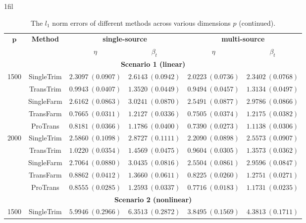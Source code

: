 \documentclass[12pt]{article}
\makeatletter
\newcommand*{\centerfloat}{%
  \parindent \z@
  \leftskip \z@ \@plus 1fil \@minus \marginparwidth
  \rightskip \leftskip
  \parfillskip \z@skip}
\makeatother
\begin{document}
\begin{table}[!ht]
\renewcommand{\arraystretch}{0.6}
\footnotesize
\centerfloat
\caption{The $l_1$ norm errors of different methods across various dimensions $p$ (continued).}
\label{table:l1_norm_p_sd_continued}
\begin{tabular}{cccccc}
        \toprule
        \multirow{2}{*}{$\bm{p}$} & \multirow{2}{*}{\textbf{Method}} & \multicolumn{2}{c}{\textbf{single-source}} & \multicolumn{2}{c}{\textbf{multi-source}}\\
        \cmidrule(lr){3-4} \cmidrule(lr){5-6} 
        & & $\eta$ & $\beta_{t}$ & $\eta$& $\beta_{t}$ \\
        \midrule
        \multicolumn{6}{c}{\textbf{Scenario 1 (linear)}}\\
        \hline
       \multirow{5}{*}{1500}
& SingleTrim  & $2.3097\ (0.0907)$ & $2.6143\ (0.0942)$ & $2.0223\ (0.0736)$ & $2.3402\ (0.0768)$ \\
& TransTrim   & $0.9943\ (0.0407)$ & $1.3520\ (0.0449)$ & $0.9494\ (0.0457)$ & $1.3134\ (0.0497)$ \\
& SingleFarm  & $2.6162\ (0.0863)$ & $3.0241\ (0.0870)$ & $2.5491\ (0.0877)$ & $2.9786\ (0.0866)$ \\
& TransFarm   & $0.7665\ (0.0311)$ & $1.2127\ (0.0336)$ & $0.7505\ (0.0374)$ & $1.2175\ (0.0382)$ \\
& ProTrans    & $\bm{0.8181}\ (0.0366)$ & $\bm{1.1786}\ (0.0400)$ & $\bm{0.7390}\ (0.0273)$ & $\bm{1.1138}\ (0.0306)$ \\
\hline
\multirow{5}{*}{2000}
& SingleTrim  & $2.5860\ (0.1098)$ & $2.8727\ (0.1111)$ & $2.2090\ (0.0898)$ & $2.5573\ (0.0907)$ \\
& TransTrim   & $1.0220\ (0.0354)$ & $1.4569\ (0.0475)$ & $0.9604\ (0.0305)$ & $1.3573\ (0.0362)$ \\
& SingleFarm  & $2.7064\ (0.0880)$ & $3.0435\ (0.0816)$ & $2.5504\ (0.0861)$ & $2.9596\ (0.0847)$ \\
& TransFarm   & $0.8862\ (0.0412)$ & $1.3660\ (0.0611)$ & $0.8225\ (0.0260)$ & $1.2751\ (0.0271)$ \\
& ProTrans    & $\bm{0.8555}\ (0.0285)$ & $\bm{1.2593}\ (0.0337)$ & $\bm{0.7716}\ (0.0183)$ & $\bm{1.1731}\ (0.0235)$ \\
        \hline
         \multicolumn{6}{c}{\textbf{Scenario 2 (nonlinear)}}\\
         \hline
        \multirow{5}{*}{1500}
& SingleTrim  & $5.9946\ (0.2966)$ & $6.3513\ (0.2872)$ & $3.8495\ (0.1569)$ & $4.3813\ (0.1711)$ \\

\end{tabular}
\end{table}
\end{document}
